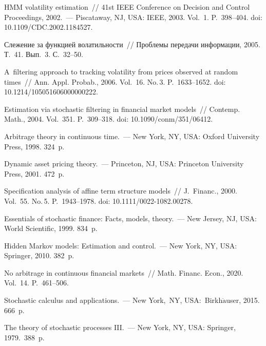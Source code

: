\begin{multicols}{2}
{\small\frenchspacing
 {\baselineskip=12pt
 \begin{thebibliography}{99}
 HMM volatility estimation~// 
41st IEEE Conference on Decision and Control Proceedings, 2002.~--- Piscataway, NJ, USA: IEEE, 2003. Vol.~1. P.~398--404.
doi: 10.1109/CDC.2002.1184527.

 Слежение за функцией волатильности~// Проб\-ле\-мы передачи информации, 2005. Т.~41. Вып.~3. С.~32--50.

 A~filtering approach to tracking volatility from prices observed at random times~// 
Ann. Appl. Probab.,  2006. Vol.~16. No.\,3. P.~1633--1652. doi: 10.1214/105051606000000222.

 Estimation via stochastic filtering in financial market models~// Contemp. Math., 2004. Vol.~351.  P.~309--318.
doi: 10.1090/conm/351/06412.

 Arbitrage theory in continuous time.~--- New York, NY, USA: Oxford University Press, 1998. 324~p.

 Dynamic asset pricing theory.~--- Princeton, NJ, USA: Princeton University Press, 2001. 472~p.

 Specification analysis of affine term structure models~//
J.~Financ., 2000. Vol.~55. No.\,5. P.~1943--1978. doi: 10.1111/0022-1082.00278.

  Essentials of stochastic finance: Facts, models, theory.~--- New Jersey, NJ, USA: World Scientific, 1999. 834~p.

 

  Hidden Markov models: Estimation and control.~--- New York, NY, USA: Springer, 2010. 382~p.
 
 No arbitrage in continuous financial markets~// Math. Financ. Econ., 2020. Vol.~14. P.~461--506.


  Stochastic calculus and applications.~--- New York,~NY, USA:~Birkh$\ddot{\mbox{a}}$user, 2015. 666~p.

  The theory of stochastic processes III.~--- New York, NY, USA: Springer, 1979.~388~p.


\end{thebibliography}}}
\end{multicols}
